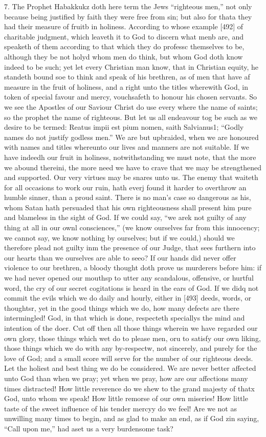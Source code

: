 7. The Prophet Habakkukz doth here term the Jews “righteous men,” not only because being justified by faith they were free from sin; but also for thata they had their measure of fruitb in holiness. According to whose example [492] of charitable judgment, which leaveth it to God to discern what menb are, and speaketh of them according to that which they do professc themselves to be, although they be not holyd whom men do think, but whom God doth know indeed to be such; yet let every Christian man know, that in Christian equity, he standeth bound soe to think and speak of his brethren, as of men that have af measure in the fruit of holiness, and a right unto the titles wherewith God, in token of special favour and mercy, vouchsafeth to honour his chosen servants. So we see the Apostles of our Saviour Christ do use every where the name of saints; so the prophet the name of righteous. But let us all endeavour tog be such as we desire to be termed: Reatus impii est pium nomen, saith Salvianus1; “Godly names do not justify godless men.” We are but upbraided, when we are honoured with names and titles whereunto our lives and manners are not suitable. If we have indeedh our fruit in holiness, notwithstanding we must note, that the more we abound thereini, the more need we have to crave that we may be strengthened and supported. Our very virtues may be snares unto us. The enemy that waiteth for all occasions to work our ruin, hath everj found it harder to overthrow an humble sinner, than a proud saint. There is no man’s case so dangerous as his, whom Satan hath persuaded that his own righteousness shall present him pure and blameless in the sight of God. If we could say, “we arek not guilty of any thing at all in our ownl consciences,” (we know ourselves far from this innocency; we cannot say, we know nothing by ourselves; but if we could,) should we therefore plead not guilty inm the presence of our Judge, that sees furthern into our hearts than we ourselves are able to seeo? If our hands did never offer violence to our brethren, a bloody thought doth prove us murderers before him: if we had never opened our mouthsp to utter any scandalous, offensive, or hurtful word, the cry of our secret cogitations is heard in the ears of God. If we didq not commit the evils which we do daily and hourly, either in [493] deeds, words, or thoughtsr, yet in the good things which we do, how many defects are there intermingled! God, in that which is done, respecteth speciallys the mind and intention of the doer. Cut off then all those things wherein we have regarded our own glory, those things which wet do to please men, oru to satisfy our own liking, those things which we do with any by-respectw, not sincerely, and purely for the love of God; and a small score will serve for the number of our righteous deeds. Let the holiest and best thing we do be considered. We are never better affected unto God than when we pray; yet when we pray, how are our affections many times distracted! How little reverence do we shew to the grand majesty of thatx God, unto whom we speak! How little remorse of our own miseries! How little taste of the sweet influence of his tender mercyy do we feel! Are we not as unwilling many times to begin, and as glad to make an end, as if God zin saying, “Call upon me,” had aset us a very burdensome task?

